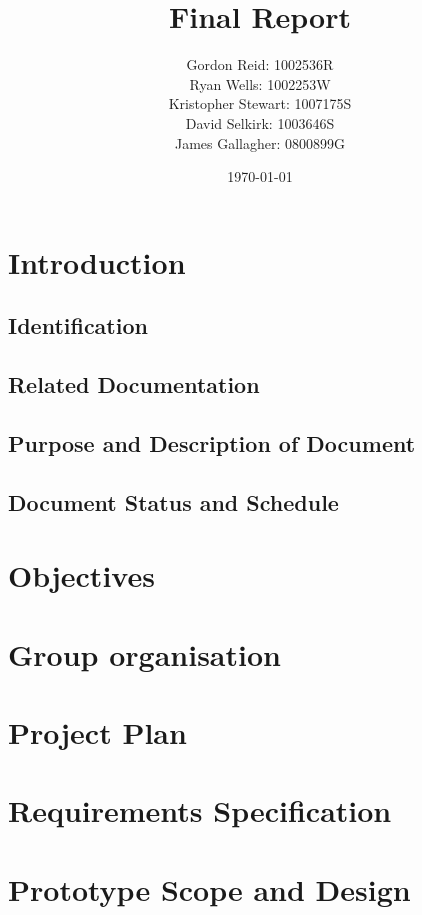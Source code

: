 \documentclass{l3deliverable}
\title{Final Report}
\author{
    Gordon Reid: 1002536R\\
    Ryan Wells: 1002253W\\
    Kristopher Stewart: 1007175S\\
    David Selkirk: 1003646S\\
    James Gallagher: 0800899G\\
}
\date{\today}
\begin{document}
\maketitle

\tableofcontents

\newpage

\section{Introduction}

\subsection{Identification}

\subsection{Related Documentation}

\subsection{Purpose and Description of Document}

\subsection{Document Status and Schedule}

\section{Objectives}

\section{Group organisation}

\section{Project Plan}

\section{Requirements Specification}

\section{Prototype Scope and Design}
\end{document}
